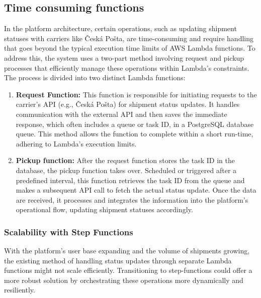 \subsection{Time consuming functions}
In the platform architecture, certain operations, such as updating shipment statuses with carriers like Česká Pošta, are time-consuming and require handling that goes beyond the typical execution time limits of AWS Lambda functions. 
To address this, the system uses a two-part method involving request and pickup processes that efficiently manage these operations within Lambda's constraints.
The process is divided into two distinct Lambda functions:
\begin{enumerate}
    \item \textbf{Request Function:} This function is responsible for initiating requests to the carrier's API (e.g., Česká Pošta) for shipment status updates. It handles communication with the external API and then saves the immediate response, which often includes a queue or task ID, in a PostgreSQL database queue. This method allows the function to complete within a short run-time, adhering to Lambda's execution limits.
    \item \textbf{Pickup function:} After the request function stores the task ID in the database, the pickup function takes over. Scheduled or triggered after a predefined interval, this function retrieves the task ID from the queue and makes a subsequent API call to fetch the actual status update. Once the data are received, it processes and integrates the information into the platform's operational flow, updating shipment statuses accordingly.
\end{enumerate}

\subsubsection{Scalability with Step Functions}
With the platform's user base expanding and the volume of shipments growing, the existing method of handling status updates through separate Lambda functions might not scale efficiently. Transitioning to \gls{step-functions} could offer a more robust solution by orchestrating these operations more dynamically and resiliently.






